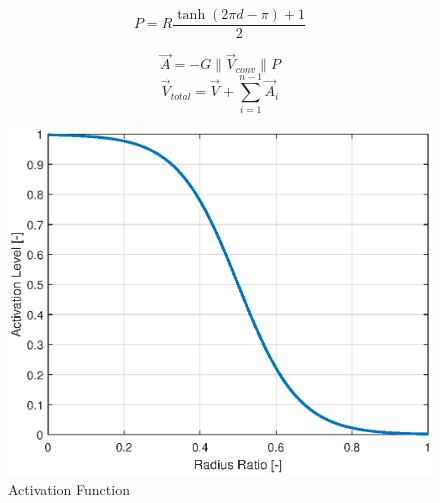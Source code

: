 \documentclass[conf]{new-aiaa}
\begin{document}
\begin{equation} \label{eq:tanh}
P = R\frac{\tanh \left( 2 \pi d - \pi \right)+1}{2}
\end{equation}

\begin{equation} \label{eq:vfavoid}
\overrightarrow{A} = -G  \lVert \overrightarrow{V}_{conv} \rVert P
\end{equation}
\begin{equation} \label{eq:vftotal}
\overrightarrow{V}_{total} = \overrightarrow{V} + \sum_{i=1}^{n-1} \overrightarrow{A}_i
\end{equation}
\begin{figure}[H]
	\centering
	\includegraphics[width=0.7\linewidth]{tanh}
	\caption{Activation Function}
	\label{fig:tanh}
\end{figure}
\end{document}
